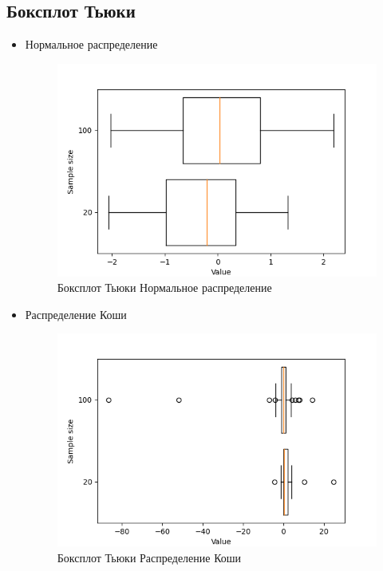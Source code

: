 \subsection{Боксплот Тьюки}
\label{subsec:result_boxplot}
\begin{itemize}
	\item{Нормальное распределение}
	\begin{figure}[H]
		\begin{center}
			\includegraphics[scale=0.75]{part_boxplot/figures/normal}
			\caption{Боксплот Тьюки Нормальное распределение}
			\label{fig:boxplot_normal}
		\end{center}
	\end{figure}
	
	\item{Распределение Коши}
	\begin{figure}[H]
		\begin{center}
			\includegraphics[scale=0.75]{part_boxplot/figures/cauchy}
			\caption{Боксплот Тьюки Распределение Коши}
			\label{fig:boxplot_cauchy}
		\end{center}
	\end{figure}
	

\end{itemize}
